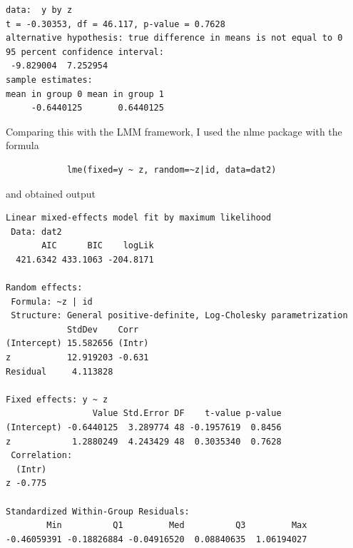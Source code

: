 \documentclass[11pt]{article}
\begin{document}
\begin{enumerate}
\begin{verbatim}
data:  y by z
t = -0.30353, df = 46.117, p-value = 0.7628
alternative hypothesis: true difference in means is not equal to 0
95 percent confidence interval:
 -9.829004  7.252954
sample estimates:
mean in group 0 mean in group 1 
     -0.6440125       0.6440125 

		\end{verbatim}
		Comparing this with the LMM framework, I used the nlme package with the formula \begin{verbatim}
			lme(fixed=y ~ z, random=~z|id, data=dat2)
		\end{verbatim}
		and obtained output
		\begin{verbatim}
Linear mixed-effects model fit by maximum likelihood
 Data: dat2 
       AIC      BIC    logLik
  421.6342 433.1063 -204.8171

Random effects:
 Formula: ~z | id
 Structure: General positive-definite, Log-Cholesky parametrization
            StdDev    Corr  
(Intercept) 15.582656 (Intr)
z           12.919203 -0.631
Residual     4.113828       

Fixed effects: y ~ z 
                 Value Std.Error DF    t-value p-value
(Intercept) -0.6440125  3.289774 48 -0.1957619  0.8456
z            1.2880249  4.243429 48  0.3035340  0.7628
 Correlation: 
  (Intr)
z -0.775

Standardized Within-Group Residuals:
        Min          Q1         Med          Q3         Max 
-0.46059391 -0.18826884 -0.04916520  0.08840635  1.06194027 


\end{verbatim}
\end{enumerate}
\end{document}
